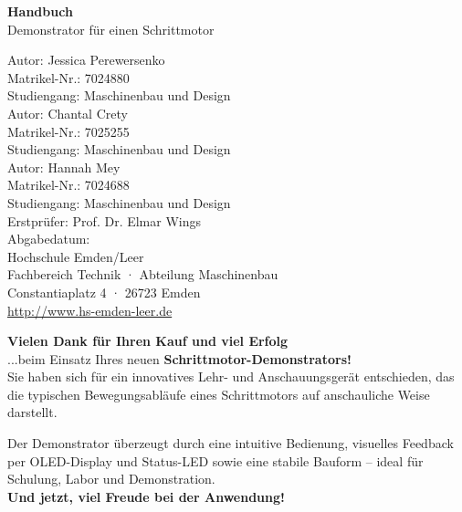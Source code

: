\documentclass[a4paper,12pt,final]{report}
\begin{document}
	
	\begin{titlepage}
		\centering
		\vspace*{2cm}
		{\Huge \textbf{Handbuch}}\\[1.5cm]
		{\LARGE Demonstrator für einen Schrittmotor}\\[4cm]
		\begin{flushleft}
			\large
			Autor: Jessica Perewersenko\\
			Matrikel-Nr.: 7024880\\
			Studiengang: Maschinenbau und Design\\[1cm]
			
			Autor: Chantal Crety\\
			Matrikel-Nr.: 7025255\\
			Studiengang: Maschinenbau und Design\\[1cm]
			
			Autor: Hannah Mey\\
			Matrikel-Nr.: 7024688\\
			Studiengang: Maschinenbau und Design\\[1.5cm]
			
			
			Erstprüfer: Prof. Dr. Elmar Wings\\
			Abgabedatum: \\[1.5cm]
			
			Hochschule Emden/Leer\\
			Fachbereich Technik · Abteilung Maschinenbau\\
			Constantiaplatz 4 · 26723 Emden\\
			\url{http://www.hs-emden-leer.de}
		\end{flushleft}
	\end{titlepage}
	
	\vspace*{\fill}
	\begin{center}
		\begin{tcolorbox}[
			colback=white!95!gray,
			colframe=black,
			width=0.9\textwidth,
			boxrule=0.5mm,
			arc=2mm,
			auto outer arc,
			drop shadow
			]
			\textbf{Vielen Dank für Ihren Kauf und viel Erfolg} \\
			...beim Einsatz Ihres neuen \textbf{Schrittmotor-Demonstrators!}\\[1em]
			
			Sie haben sich für ein innovatives Lehr- und Anschauungsgerät entschieden, das die typischen Bewegungsabläufe eines Schrittmotors auf anschauliche Weise darstellt.  
			
			Der Demonstrator überzeugt durch eine intuitive Bedienung, visuelles Feedback per OLED-Display und Status-LED sowie eine stabile Bauform – ideal für Schulung, Labor und Demonstration.\\
			
			\medskip
			\centering
			\textbf{Und jetzt, viel Freude bei der Anwendung!}
		\end{tcolorbox}
	\end{center}
	\vspace*{\fill}
	
\end{document}
